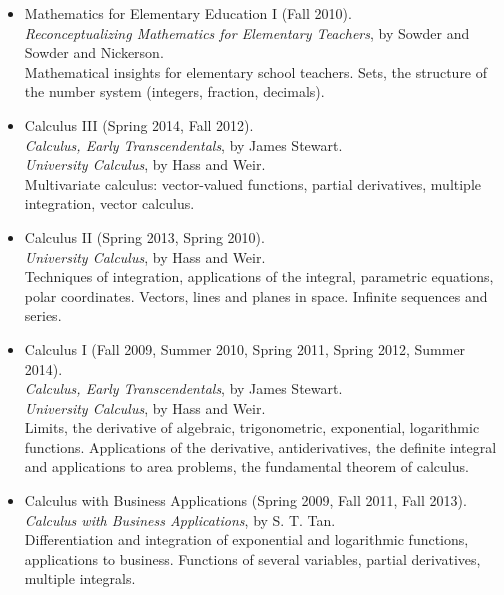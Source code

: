 \documentclass[11pt]{article}
\begin{document}

\begin{itemize}
  \item{}
    Mathematics for Elementary Education I (Fall 2010).\\
    \emph{Reconceptualizing Mathematics for Elementary Teachers},
    by Sowder and Sowder and Nickerson.\\
    Mathematical insights for elementary school teachers. Sets, the
    structure of the number system (integers, fraction, decimals).

  \item{}
    Calculus III (Spring 2014, Fall 2012).\\
    \emph{Calculus, Early Transcendentals}, by James Stewart.\\
    \emph{University Calculus}, by Hass and Weir.\\
    Multivariate calculus: vector-valued functions, partial derivatives,
    multiple integration, vector calculus.

  \item{}
    Calculus II (Spring 2013, Spring 2010).\\
    \emph{University Calculus}, by Hass and Weir.\\
    Techniques of integration, applications of the integral, parametric
    equations, polar coordinates. Vectors, lines and planes in space.
    Infinite sequences and series.

  \item{}
    Calculus I (Fall 2009, Summer 2010,
    Spring 2011, Spring 2012, Summer 2014).\\
    \emph{Calculus, Early Transcendentals}, by James Stewart.\\
    \emph{University Calculus}, by Hass and Weir.\\
    Limits, the derivative of algebraic, trigonometric, exponential,
    logarithmic functions. Applications of the derivative,
    antiderivatives, the definite integral and applications to area
    problems, the fundamental theorem of calculus.

  \item{}
    Calculus with Business Applications
    (Spring 2009, Fall 2011, Fall 2013).\\
    \emph{Calculus with Business Applications}, by S. T. Tan.\\
    Differentiation and integration of exponential and logarithmic
    functions, applications to business. Functions of several variables,
    partial derivatives, multiple integrals.
  

\end{itemize}
\end{document}

